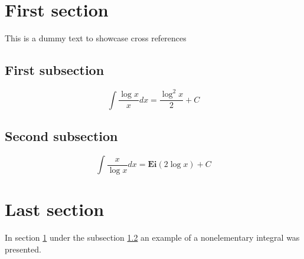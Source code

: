 \documentclass{article}
\begin{document}
\section{First section} \label{first_section}
This is a dummy text to showcase cross references

\subsection{First subsection} \label{first_subsection}
\[\int\frac{\log{x}}{x}dx=\frac{\log^2{x}}{2} + C\]

\subsection{Second subsection} \label{second_subsection}
\[\int\frac{x}{\log{x}}dx=\mathbf{Ei}(2\log{x})+C\]

\section{Last section}
In section \ref{first_section} under the subsection
\ref{second_subsection} an example of a nonelementary
integral was presented.
\end{document}
